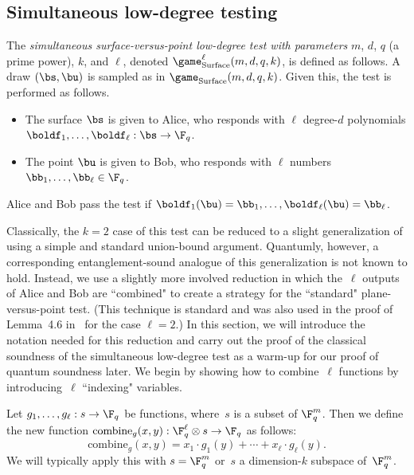 \subsection{Simultaneous low-degree testing}\label{sec:simultaneous-classical}

\begin{definition}\label{def:simultaneous-plane-v-point}
The \emph{simultaneous surface-versus-point low-degree test with parameters} $m$, $d$, $q$ (a prime power), $k$, and $\ell$, denoted $\game_{\mathrm{Surface}}^\ell(m, d, q, k)$,
 is defined as follows.
A draw $(\bs, \bu)$ is sampled as in $\game_{\mathrm{Surface}}(m,d,q,k)$. Given this, the test is performed as follows.
\begin{itemize}
\itemsep -.5pt
\item[$\circ$] The surface $\bs$ is given to Alice, who responds with $\ell$ degree-$d$ polynomials $\boldf_1, \ldots, \boldf_{\ell}: \bs \rightarrow \F_q$.
\item[$\circ$] The point $\bu$ is given to Bob, who responds with $\ell$ numbers $\bb_1, \ldots, \bb_{\ell} \in \F_q$.
\end{itemize}
Alice and Bob pass the test if $\boldf_1(\bu) = \bb_1, \ldots,
\boldf_{\ell}(\bu) = \bb_{\ell}$.
\label{def:simul}
\end{definition}
Classically, the $k=2$ case of this test can be reduced to a slight generalization of  using a
simple and standard union-bound argument.
Quantumly, however, a corresponding entanglement-sound analogue of this generalization is not known to hold.
Instead, we use a slightly more involved reduction in which the~$\ell$ outputs of Alice and Bob are ``combined" to create a strategy for the ``standard" plane-versus-point test.
(This technique is standard and was also used in the proof of Lemma~4.6 in~\cite{NV18a} for the case $\ell =2$.)
In this section, we will introduce the notation needed for this reduction
and carry out the proof of the classical soundness of the simultaneous low-degree test
as a warm-up for our proof of quantum soundness later.
We begin by showing how to combine~$\ell$ functions by introducing~$\ell$ ``indexing" variables.

\begin{notation}
Let $g_1, \ldots, g_\ell:s \rightarrow \F_q$ be functions, where~$s$ is a subset of $\F_q^m$.
Then we define the new function $\mathrm{combine}_g(x, y): \F_q^\ell \otimes s \rightarrow \F_q$ as follows:
\begin{equation*}
\mathrm{combine}_g(x, y) = x_1\cdot g_1(y) + \cdots + x_\ell \cdot g_\ell(y).
\end{equation*}
We will typically apply this with $s = \F_q^m$ or~$s$ a dimension-$k$ subspace of~$\F_q^m$.
\end{notation}

